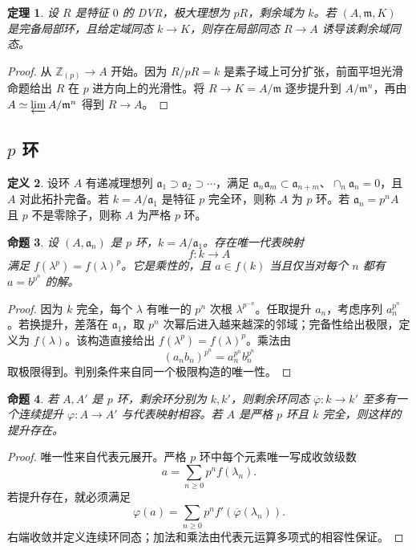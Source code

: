 \documentclass[11pt,a4paper,openany]{ctexbook}
\numberwithin{equation}{chapter}
\newcommand{\Z}{\mathbb{Z}}
\theoremstyle{plain}
\newtheorem{theorem}{定理}[chapter]
\newtheorem{proposition}[theorem]{命题}
\theoremstyle{definition}
\newtheorem{definition}[theorem]{定义}
\theoremstyle{remark}
\begin{document}
\begin{theorem}
设 $R$ 是特征 $0$ 的 DVR，极大理想为 $pR$，剩余域为 $k$。若 $(A,\mathfrak m,K)$ 是完备局部环，且给定域同态 $k\to K$，则存在局部同态 $R\to A$ 诱导该剩余域同态。
\end{theorem}

\begin{proof}
从 $\Z_{(p)}\to A$ 开始。因为 $R/pR=k$ 是素子域上可分扩张，前面平坦光滑命题给出 $R$ 在 $p$ 进方向上的光滑性。将 $R\to K=A/\mathfrak m$ 逐步提升到 $A/\mathfrak m^n$，再由 $A\simeq\varprojlim A/\mathfrak m^n$ 得到 $R\to A$。
\end{proof}

\subsection{\texorpdfstring{$p$ 环}{p 环}}

\begin{definition}
设环 $A$ 有递减理想列 $\mathfrak a_1\supset\mathfrak a_2\supset\cdots$，满足 $\mathfrak a_n\mathfrak a_m\subset\mathfrak a_{n+m}$、$\cap_n\mathfrak a_n=0$，且 $A$ 对此拓扑完备。若 $k=A/\mathfrak a_1$ 是特征 $p$ 完全环，则称 $A$ 为 $p$ 环。若 $\mathfrak a_n=p^nA$ 且 $p$ 不是零除子，则称 $A$ 为严格 $p$ 环。
\end{definition}

\begin{proposition}
设 $(A,\mathfrak a_n)$ 是 $p$ 环，$k=A/\mathfrak a_1$。存在唯一代表映射
\[
  f:k\to A
\]
满足 $f(\lambda^p)=f(\lambda)^p$。它是乘性的，且 $a\in f(k)$ 当且仅当对每个 $n$ 都有 $a=b^{p^n}$ 的解。
\end{proposition}

\begin{proof}
因为 $k$ 完全，每个 $\lambda$ 有唯一的 $p^n$ 次根 $\lambda^{p^{-n}}$。任取提升 $a_n$，考虑序列 $a_n^{p^n}$。若换提升，差落在 $\mathfrak a_1$，取 $p^n$ 次幂后进入越来越深的邻域；完备性给出极限，定义为 $f(\lambda)$。该构造直接给出 $f(\lambda^p)=f(\lambda)^p$。乘法由
\[
  (a_nb_n)^{p^n}=a_n^{p^n}b_n^{p^n}
\]
取极限得到。判别条件来自同一个极限构造的唯一性。
\end{proof}

\begin{proposition}
若 $A,A'$ 是 $p$ 环，剩余环分别为 $k,k'$，则剩余环同态 $\overline\varphi:k\to k'$ 至多有一个连续提升 $\varphi:A\to A'$ 与代表映射相容。若 $A$ 是严格 $p$ 环且 $k$ 完全，则这样的提升存在。
\end{proposition}

\begin{proof}
唯一性来自代表元展开。严格 $p$ 环中每个元素唯一写成收敛级数
\[
  a=\sum_{n\ge0}p^nf(\lambda_n).
\]
若提升存在，就必须满足
\[
  \varphi(a)=\sum_{n\ge0}p^nf'(\overline\varphi(\lambda_n)).
\]
右端收敛并定义连续环同态；加法和乘法由代表元运算多项式的相容性保证。
\end{proof}
\end{document}
